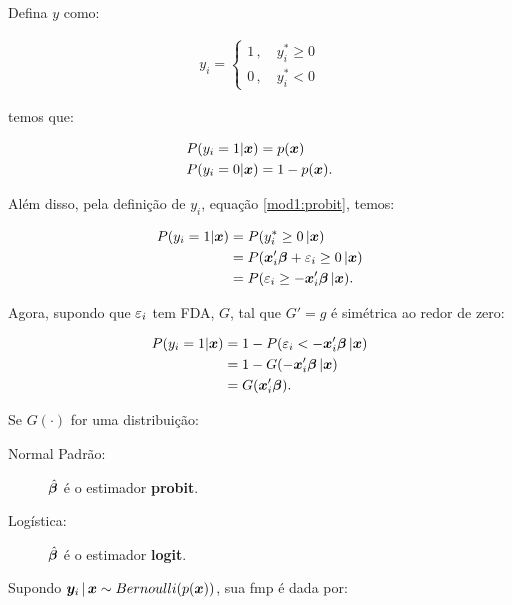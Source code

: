 \documentclass[11pt, oneside, a4paper, article]{article}
\numberwithin{equation}{section}
\begin{document}
\begin{description}
	\noindent
	Defina $y$ como:

	\vspace{-1 em}
	\begin{align*}
		y_{i} =
		\begin{cases}
			1 \, , \quad y^{*}_{i} \geq 0
			\\
			0 \, , \quad y^{*}_{i} < 0
		\end{cases}
	\end{align*}

	\noindent
	temos que:

	\vspace{-1 em}
	\begin{align*}
		P( y_{i} = 1 | \boldsymbol{x} ) &= p( \boldsymbol{x} )
		\\
		P( y_{i} = 0 | \boldsymbol{x} ) &= 1 - p( \boldsymbol{x} ).
	\end{align*}

	Além disso, pela definição de $y_{i}$, equação \eqref{mod1:probit}, temos:

	\vspace{-1 em}
	\begin{align*}
		P( y_{i} = 1 | \boldsymbol{x} ) &= P(y_{i}^{*} \geq 0 \, | \boldsymbol{x} )
		\\
		&= P( \boldsymbol{x}_{i}' \boldsymbol{\beta} + \varepsilon_{i} \geq 0 \, | \boldsymbol{x} )
		\\
		&= P( \varepsilon_{i} \geq - \boldsymbol{x}_{i}' \boldsymbol{\beta}  \, | \boldsymbol{x} ).
	\end{align*}

	\noindent
	Agora, supondo que $\varepsilon_{i}$ tem FDA, $G$, tal que $G'=g$ é simétrica ao redor de zero:

	\vspace{-1 em}
	\begin{align*}
		P( y_{i} = 1 | \boldsymbol{x} ) 
		&= 1 - P( \varepsilon_{i} < - \boldsymbol{x}_{i}' \boldsymbol{\beta}  \, | \boldsymbol{x} )
		\\
		&= 1 - G( - \boldsymbol{x}_{i}' \boldsymbol{\beta}  \, | \boldsymbol{x} )
		\\
		&= G( \boldsymbol{x}_{i}' \boldsymbol{\beta} ).
	\end{align*}

	Se $G(\cdot)$ for uma distribuição:

	\begin{description}
		\item [Normal Padrão:] $\hat{\boldsymbol{\beta}}$ é o estimador \textbf{probit}.
		\item [Logística:] $\hat{\boldsymbol{\beta}}$ é o estimador \textbf{logit}.
	\end{description}

	Supondo $\boldsymbol{y}_{i} \, | \, \boldsymbol{x} \sim Bernoulli(p(\boldsymbol{x}))$, sua fmp é dada por:


\end{description}
\end{document}
